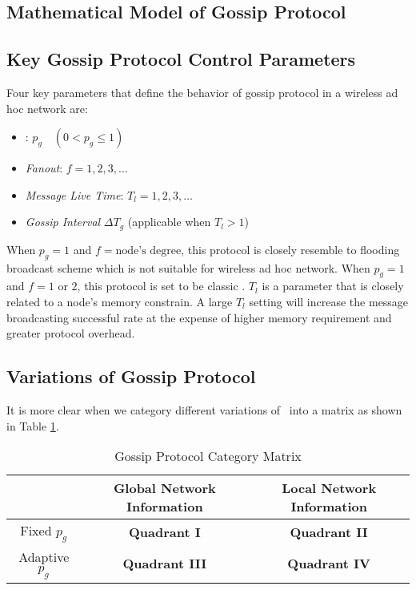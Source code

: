 \subsection{Mathematical Model of Gossip Protocol}

\subsection{Key Gossip Protocol Control Parameters}
Four key parameters that define the behavior of gossip protocol in a wireless ad hoc network are: 

\begin{itemize}
	\item \emph{\pog}: $p_g  \quad (0 < p_g \leq 1)$
	\item \emph{Fanout}: $f = 1, 2, 3, \ldots$
	\item \emph{Message Live Time}: $T_l = 1,2,3, \ldots$
	\item \emph{Gossip Interval} $\Delta T_g$ (applicable when $T_l > 1$)
\end{itemize}

When $p_g = 1$ and $f = \mbox{node's degree}$, this protocol is closely resemble to flooding broadcast scheme which is not suitable for wireless ad hoc network. When $p_g = 1$ and $f = 1 \mbox{ or } 2$, this protocol is set to be classic \gp. $T_l$ is a parameter that is closely related to a node's memory constrain. A large $T_l$ setting will increase the message broadcasting successful rate at the expense of higher memory requirement and greater protocol overhead. 

\subsection{Variations of Gossip Protocol}

It is more clear when we category different variations of \gp ~into a matrix as shown in Table \ref{table:matrix}. 

\begin{table}[h]
	\centering
	\caption{Gossip Protocol Category Matrix}
	\label{table:matrix}
	\centering
	\begin{tabular}{|c|c|c|}
		\hline 
		& Global Network Information & Local Network Information \\ 
		\hline 
		Fixed  $p_g$ & \textbf{Quadrant I} & \textbf{Quadrant II} \\ 
		\hline 
		Adaptive $p_g$ & \textbf{Quadrant III} & \textbf{Quadrant IV} \\ 
		\hline 
	\end{tabular} 
\end{table}


